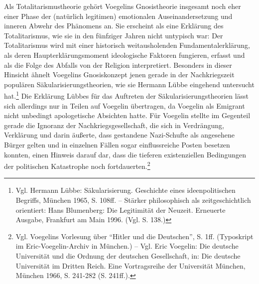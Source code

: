 Als Totalitarismustheorie gehört Voegelins Gnosistheorie insgesamt noch eher
einer Phase der (natürlich legitimen) emotionalen Auseinandersetzung und
inneren Abwehr des Phänomens an. Sie erscheint als eine Erklärung des
Totalitarismus, wie sie in den fünfziger Jahren nicht untypisch war: Der
Totalitarismus wird mit einer historisch weitausholenden Fundamentalerklärung,
als deren Haupterklärungsmoment ideologische Faktoren fungieren, erfasst und
als die Folge des Abfalls von der Religion interpretiert. Besonders in dieser
Hinsicht ähnelt Voegelins Gnosiskonzept jenen gerade in der Nachkriegszeit
populären Säkularisierungstheorien, wie sie Hermann Lübbe eingehend untersucht
hat.\footnote{Vgl. Hermann Lübbe: Säkularisierung.  Geschichte eines
  ideenpolitischen Begriffs, München 1965, S. 108ff. -- Stärker philosophisch
  als zeitgeschichtlich orientiert: Hans Blumenberg: Die Legitimität der
  Neuzeit. Erneuerte Ausgabe, Frankfurt am Main 1996. (Vgl. S. 138.)} Die
Erklärung Lübbes für das Auftreten der Säkularisierungstheorien lässt sich
allerdings nur in Teilen auf Voegelin übertragen, da Voegelin als Emigrant
nicht unbedingt apologetische Absichten hatte. Für Voegelin stellte im
Gegenteil gerade die Ignoranz der Nachkriegsgesellschaft, die sich in
Verdrängung, Verklärung und darin äußerte, dass gestandene Nazi-Schufte als
angesehene Bürger gelten und in einzelnen Fällen sogar einflussreiche Posten
besetzen konnten, einen Hinweis darauf dar, dass die tieferen existenziellen
Bedingungen der politischen Katastrophe noch fortdauerten.\footnote{Vgl.
  Voegelins Vorlesung über "`Hitler und die Deutschen"', S. 1ff. (Typoskript im
  Eric-Voegelin-Archiv in München.) -- Vgl. Eric Voegelin: Die deutsche
  Universität und die Ordnung der deutschen Gesellschaft, in: Die deutsche
  Universität im Dritten Reich.  Eine Vortragsreihe der Universität München,
  München 1966, S. 241-282 (S. 241ff.).}

